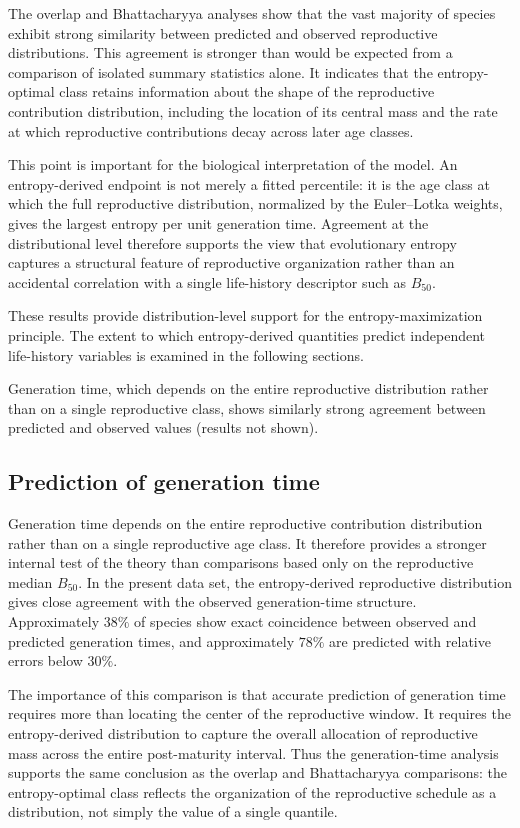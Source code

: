 \documentclass[10pt,a4paper]{amsart}
\theoremstyle{definition}
\theoremstyle{remark}
\numberwithin{equation}{section}
\begin{document}
The overlap and Bhattacharyya analyses show that the vast majority of
species exhibit strong similarity between predicted and observed
reproductive distributions. This agreement is stronger than would be
expected from a comparison of isolated summary statistics alone. It
indicates that the entropy-optimal class retains information about the
shape of the reproductive contribution distribution, including the
location of its central mass and the rate at which reproductive
contributions decay across later age classes.

This point is important for the biological interpretation of the model.
An entropy-derived endpoint is not merely a fitted percentile: it is the
age class at which the full reproductive distribution, normalized by the
Euler--Lotka weights, gives the largest entropy per unit generation
time. Agreement at the distributional level therefore supports the view
that evolutionary entropy captures a structural feature of reproductive
organization rather than an accidental correlation with a single
life-history descriptor such as $B_{50}$.

These results provide distribution-level support for the
entropy-maximization principle. The extent to which entropy-derived
quantities predict independent life-history variables is examined in
the following sections.

Generation time, which depends on the entire reproductive
distribution rather than on a single reproductive class,
shows similarly strong agreement between predicted and observed
values (results not shown).


\subsection{Prediction of generation time}\label{subsec_generation_time_prediction}

Generation time depends on the entire reproductive contribution
distribution rather than on a single reproductive age class. It therefore
provides a stronger internal test of the theory than comparisons based
only on the reproductive median $B_{50}$. In the present data set, the
entropy-derived reproductive distribution gives close agreement with the
observed generation-time structure. Approximately $38\%$ of species show
exact coincidence between observed and predicted generation times, and
approximately $78\%$ are predicted with relative errors below $30\%$.

The importance of this comparison is that accurate prediction of
generation time requires more than locating the center of the
reproductive window. It requires the entropy-derived distribution to
capture the overall allocation of reproductive mass across the entire
post-maturity interval. Thus the generation-time analysis supports the
same conclusion as the overlap and Bhattacharyya comparisons: the
entropy-optimal class reflects the organization of the reproductive
schedule as a distribution, not simply the value of a single quantile.
\end{document}
